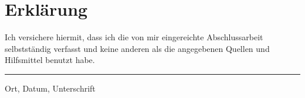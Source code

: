 \chapter*{Erklärung}
\thispagestyle{empty}
\vspace{1cm}

Ich versichere hiermit, dass ich die von mir eingereichte Abschlussarbeit selbstständig verfasst und 
keine anderen als die angegebenen Quellen und Hilfsmittel benutzt habe.

\vspace{2cm}


\noindent\rule{\textwidth}{0.5pt}
\vspace{2cm}
Ort, Datum, Unterschrift